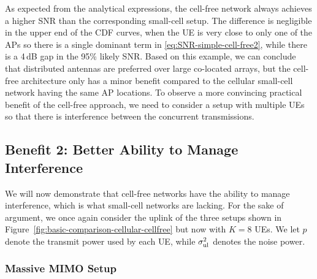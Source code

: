 As expected from the analytical expressions, the cell-free network always achieves a higher \gls{SNR} than the corresponding small-cell setup. The difference is negligible in the upper end of the \gls{CDF} curves, when the \gls{UE} is very close to only one of the \glspl{AP} so there is a single dominant term in \eqref{eq:SNR-simple-cell-free2}, while there is a 4\,dB gap in the 95\% likely \gls{SNR}. Based on this example, we can conclude that distributed antennas are preferred over large co-located arrays, but the cell-free architecture only has a minor benefit compared to the cellular small-cell network having the same \gls{AP} locations. To observe a more convincing practical benefit of the cell-free approach, we need to consider a setup with multiple \glspl{UE} so that there is interference between the concurrent transmissions.


\subsection{Benefit 2: Better Ability to Manage Interference}
\label{subsec:benefit2}

We will now demonstrate that cell-free networks have the ability to manage interference, which is what small-cell networks are lacking. For the sake of argument, we once again consider the uplink of the three setups shown in Figure~\ref{fig:basic-comparison-cellular-cellfree} but now with $K=8$ \glspl{UE}.
We let $p$ denote the transmit power used by each \gls{UE}, while $\sigma^2_{\mathrm{ul}}$ denotes the noise power. 

\subsubsection{Massive \gls{MIMO} Setup}

